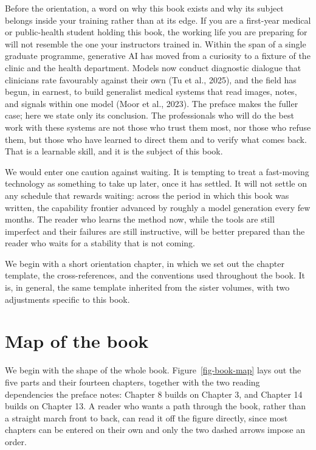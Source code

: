 \documentclass[
  letterpaper,
  11pt]{scrbook}
\begin{document}
Before the orientation, a word on why this book exists and why its
subject belongs inside your training rather than at its edge. If you are
a first-year medical or public-health student holding this book, the
working life you are preparing for will not resemble the one your
instructors trained in. Within the span of a single graduate programme,
generative AI has moved from a curiosity to a fixture of the clinic and
the health department. Models now conduct diagnostic dialogue that
clinicians rate favourably against their own ({Tu et al.}, 2025), and
the field has begun, in earnest, to build generalist medical systems
that read images, notes, and signals within one model ({Moor et al.},
2023). The preface makes the fuller case; here we state only its
conclusion. The professionals who will do the best work with these
systems are not those who trust them most, nor those who refuse them,
but those who have learned to direct them and to verify what comes back.
That is a learnable skill, and it is the subject of this book.

We would enter one caution against waiting. It is tempting to treat a
fast-moving technology as something to take up later, once it has
settled. It will not settle on any schedule that rewards waiting: across
the period in which this book was written, the capability frontier
advanced by roughly a model generation every few months. The reader who
learns the method now, while the tools are still imperfect and their
failures are still instructive, will be better prepared than the reader
who waits for a stability that is not coming.

We begin with a short orientation chapter, in which we set out the
chapter template, the cross-references, and the conventions used
throughout the book. It is, in general, the same template inherited from
the sister volumes, with two adjustments specific to this book.

\section*{Map of the book}\label{map-of-the-book}


We begin with the shape of the whole book. Figure~\ref{fig-book-map}
lays out the five parts and their fourteen chapters, together with the
two reading dependencies the preface notes: Chapter 8 builds on Chapter
3, and Chapter 14 builds on Chapter 13. A reader who wants a path
through the book, rather than a straight march front to back, can read
it off the figure directly, since most chapters can be entered on their
own and only the two dashed arrows impose an order.
\end{document}
